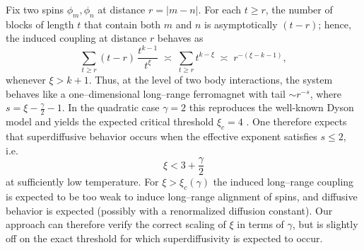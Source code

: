 \documentclass[reqno,11pt]{amsart}
\newcommand{\1}{\mathds{1}}
\theoremstyle{plain}
\theoremstyle{definition}
\numberwithin{equation}{section}
\begin{document}
Fix two spins $\phi_m,\phi_n$ at distance $r =|m-n|$. For each $t\ge r$, the number of blocks of length $t$ that contain both $m$ and $n$ is asymptotically $(t-r)$; hence, the induced coupling at distance $r$ behaves as
\begin{equation}
    \label{eq:Jr-heuristic}
    \sum_{t\ge r} (t-r)\,\frac{t^{k-1}}{t^\xi}
    \;\asymp\;
    \sum_{t\ge r} t^{k-\xi}
    \;\asymp\;
    r^{-(\xi-k-1)} ,
\end{equation}
whenever $\xi>k+1$.
Thus, at the level of two body interactions, the system behaves like a one--dimensional long--range ferromagnet with tail $\sim r^{-s}$, where $s= \xi-\frac{\gamma}{2}-1$. In the quadratic case $\gamma=2$ this reproduces the well-known Dyson model and yields the expected critical threshold $\xi_c=4$ \cite{PrSaSc08}. One therefore expects that superdiffusive behavior occurs when the effective exponent satisfies $s\le2$, i.e.
$$ \xi < 3+ \frac \gamma 2$$
at sufficiently low temperature. For $\xi>\xi_c(\gamma)$ the induced long--range coupling is expected to be too weak to induce long--range alignment of spins, and diffusive behavior is expected (possibly with a renormalized diffusion constant).
Our approach can therefore verify the correct scaling of $\xi$ in terms of $\gamma$, but is slightly off on the exact threshold for which superdiffusivity is expected to occur. 
\end{document}
